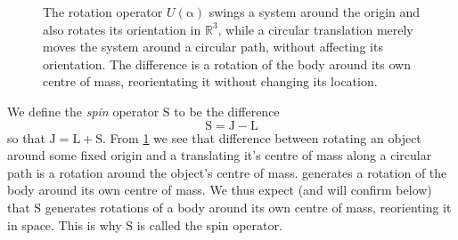 \documentclass{article}
\theoremstyle{plain}\theoremheaderfont{\normalfont\itshape}\theorembodyfont{\rmfamily}\theoremseparator{.}\newtheorem*{rem}{Remark}\newtheorem*{ex}{Example}\newtheorem*{proof}{Proof}\newtheorem*{altp}{Alternative proof}
\theoremstyle{plain}\theoremheaderfont{\normalfont\bfseries}\theorembodyfont{\rmfamily}\theoremseparator{.}\newtheorem{thm}{Theorem}[section]\newtheorem{lem}[thm]{Lemma}\newtheorem{prop}[thm]{Proposition}\newtheorem*{cor}{Corollary}\newtheorem{defn}[thm]{Definition}\newtheorem{clm}[thm]{Claim}\newtheorem{clminproof}{Claim}
\theoremstyle{break}\theoremheaderfont{\normalfont\itshape}\theorembodyfont{\rmfamily}\theoremseparator{.\medskip}\newtheorem*{proofskip}{Proof}\newtheorem*{exs}{Examples}\newtheorem*{rems}{Remarks}
\theoremstyle{break}\theoremheaderfont{\normalfont\bfseries}\theorembodyfont{\rmfamily}\theoremseparator{.\medskip}\newtheorem{lemskip}[thm]{Lemma}\newtheorem{defnskip}[thm]{Definition}\newtheorem{propskip}[thm]{Proposition}\newtheorem{thmskip}[thm]{Theorem}
\numberwithin{equation}{section}
\newcommand{\vb}[1]{\bm{\mathrm{#1}}}
\newcommand{\RR}{\mathbb{R}}
\begin{document}
    \begin{figure}
        \centering
        \caption{The rotation operator \(U(\vb{\alpha})\) swings a system around the origin and also rotates its orientation in \(\RR^3\), while a circular translation merely moves the system around a circular path, without affecting its orientation. The difference is a rotation of the body around its own centre of mass, reorientating it without changing its location.}
        \label{Fig:rotation_circular_translation_difference}
    \end{figure}

    We define the \textit{spin} operator \(\vb{S}\) to be the difference
    \begin{equation}
        \vb{S}=\vb{J}-\vb{L}
    \end{equation}
    so that \(\vb{J}=\vb{L}+\vb{S}\). From \cref{Fig:rotation_circular_translation_difference} we see that difference between rotating an object around some fixed origin and a translating it's centre of mass along a circular path is a rotation around the object's centre of mass. generates a rotation of the body around its own centre of mass. We thus expect (and will confirm below) that \(\vb{S}\) generates rotations of a body around its own centre of mass, reorienting it in space. This is why \(\vb{S}\) is called the spin operator.
\end{document}

